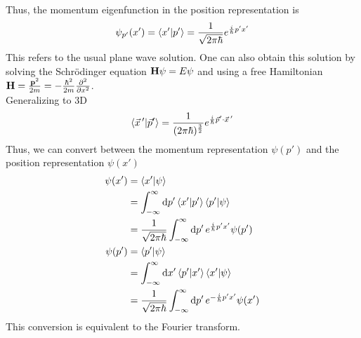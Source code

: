 \documentclass[12pt,a4paper,titlepage]{article}
\begin{document}
Thus, the momentum eigenfunction in the position representation is
\begin{equation}
\psi_{p'}(x')=\ip{x'}{p'}=\frac{1}{\sqrt{2\pi\hbar}}e^{\frac{i}{\hbar}p'x'}
\end{equation}
This refers to the usual plane wave solution. One can also obtain this solution by solving the Schr\"{o}dinger equation $\vb{H}\psi=E\psi$ and using a free Hamiltonian $\vb{H}=\frac{\vb{p}^{2}}{2m}=-\frac{\hbar^{2}}{2m}\pdv[2]{x}$.\\

Generalizing to 3D
\begin{equation}
\ip{\vec{x}\,'}{\vec{p}'}=\frac{1}{(2\pi\hbar)^{\frac{3}{2}}}e^{\frac{i}{\hbar}\vec{p}'\cdot\vec{x}\,'}
\end{equation}
Thus, we can convert between the momentum representation $\psi(p')$ and the position representation $\psi(x')$
\begin{equation}
\begin{aligned}
\psi(x')&=\ip{x'}{\psi}\\
&=\int_{-\infty}^{\infty}\dd{p'}\ip{x'}{p'}\ip{p'}{\psi}\\
&=\frac{1}{\sqrt{2\pi\hbar}}\int_{-\infty}^{\infty}\dd{p'}e^{\frac{i}{\hbar}p'x'}\psi(p')\\
\psi(p')&=\ip{p'}{\psi}\\
&=\int_{-\infty}^{\infty}\dd{x'}\ip{p'}{x'}\ip{x'}{\psi}\\
&=\frac{1}{\sqrt{2\pi\hbar}}\int_{-\infty}^{\infty}\dd{p'}e^{-\frac{i}{\hbar}p'x'}\psi(x')\\
\end{aligned}
\end{equation}
This conversion is equivalent to the Fourier transform.
\end{document}
